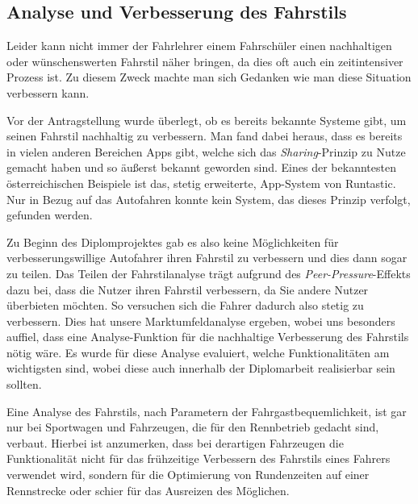 \subsection{Analyse und Verbesserung des Fahrstils}

Leider kann nicht immer der Fahrlehrer einem Fahrschüler einen nachhaltigen oder wünschenswerten Fahrstil näher bringen, da dies oft auch ein zeitintensiver Prozess ist. Zu diesem Zweck machte man sich Gedanken wie man diese Situation verbessern kann.

Vor der Antragstellung wurde überlegt, ob es bereits bekannte Systeme gibt, um seinen Fahrstil nachhaltig zu verbessern. Man fand dabei heraus, dass es bereits in vielen anderen Bereichen Apps gibt, welche sich das \textit{Sharing}-Prinzip zu Nutze gemacht haben und so äußerst bekannt geworden sind. Eines der bekanntesten österreichischen Beispiele ist das, stetig erweiterte, App-System von Runtastic. \cite{SIMR.CH1-Fahrstil-Analyse.BusinessplanRuntastic}
Nur in Bezug auf das Autofahren konnte kein System, das dieses Prinzip verfolgt, gefunden werden.

Zu Beginn des Diplomprojektes gab es also keine Möglichkeiten für verbesserungswillige Autofahrer ihren Fahrstil zu verbessern und dies dann sogar zu teilen. Das Teilen der Fahrstilanalyse trägt aufgrund des \textit{Peer-Pressure}-Effekts dazu bei, dass die Nutzer ihren Fahrstil verbessern, da Sie andere Nutzer überbieten möchten. So versuchen sich die Fahrer dadurch also stetig zu verbessern.
Dies hat unsere Marktumfeldanalyse ergeben, wobei uns besonders auffiel, dass eine Analyse-Funktion für die nachhaltige Verbesserung des Fahrstils nötig wäre. Es wurde für diese Analyse evaluiert, welche Funktionalitäten am wichtigsten sind, wobei diese auch innerhalb der Diplomarbeit realisierbar sein sollten. 
\newline

Eine Analyse des Fahrstils, nach Parametern der Fahrgastbequemlichkeit, ist gar nur bei Sportwagen und Fahrzeugen, die für den Rennbetrieb gedacht sind, verbaut. Hierbei ist anzumerken, dass bei derartigen Fahrzeugen die Funktionalität nicht für das frühzeitige Verbessern des Fahrstils eines Fahrers verwendet wird, sondern für die Optimierung von Rundenzeiten auf einer Rennstrecke oder schier für das Ausreizen des Möglichen.

